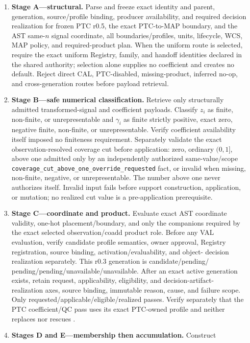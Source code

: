 \documentclass[10pt]{article}
\newcommand{\code}[1]{\nolinkurl{#1}}
\begin{document}
\begin{enumerate}
\item \textbf{Stage A---structural.} Parse and freeze exact identity and
parent, generation, source/profile binding, producer availability, and
required decision realization for frozen PTC r0.5, the exact PTC-to-MAP
boundary, and the AST same-\(n\) signal
coordinate, all boundaries/profiles, units, lifecycle, WCS, MAP policy, and
required-product plan.  When the uniform route is selected, require the exact
uniform Registry, family, and handoff identities declared in the shared
authority; selection alone supplies no coefficient and creates no default.
Reject direct CAL, PTC-disabled, missing-product,
inferred no-op, and cross-generation routes before payload retrieval.
\item \textbf{Stage B---safe numerical classification.} Retrieve only
structurally admitted transformed-signal and coefficient payloads. Classify
\(z_i\) as finite, non-finite, or unrepresentable and \(\gamma_i\) as finite
strictly positive, exact zero, negative finite, non-finite, or
unrepresentable. Verify coefficient availability itself imposed no finiteness
requirement. Separately validate the exact observation-resolved coverage cut
before application: zero, ordinary \((0,1]\), above one admitted only by an
independently authorized same-value/scope
\code{coverage_cut_above_one_override_requested} fact, or invalid when
missing, non-finite, negative, or unrepresentable. The number above one never
authorizes itself. Invalid input fails before support construction, application,
or mutation; no realized cut value is a pre-application prerequisite.
\item \textbf{Stage C---coordinate and product.} Evaluate exact AST coordinate
validity, one-hot placement/boundary, and only the companions required by the
exact selected observation/coadd product role.
Before any VAL evaluation, verify candidate profile semantics, owner approval,
Registry registration, source binding, activation/evaluability, and object-
decision realization separately. This r0.3 generation is candidate/pending/
pending/pending/unavailable/unavailable. After an exact active generation
exists, retain request, applicability, eligibility, and decision-artifact-
realization axes, source binding, immutable reason, cause, and failure scope.
Only requested/applicable/eligible/realized passes. Verify separately that the
PTC coefficient/QC pass uses its exact PTC-owned profile and neither replaces
nor rescues \SCIMapUpstreamProfile.
\item \textbf{Stages D and E---membership then accumulation.} Construct

\end{enumerate}
\end{document}
